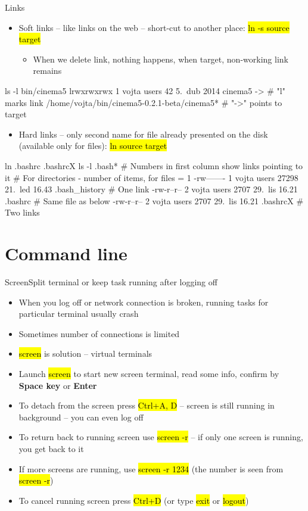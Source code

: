 \documentclass[compress, ucs, xelatex, 11pt, xcolor=svgnames,
  hyperref={
    bookmarks=true,
    unicode=true,
    colorlinks=true,
    pdftitle={Linux, command line and MetaCentrum},
    plainpages=false,
    pdfauthor={Vojtech Zeisek},
    pdfsubject={Course about use of Linux command line, writing shell scripts and using MetaCentrum of CESNET},
    pdfcreator={XeLaTeX},
    pdfkeywords={Linux, GNU, BASH, shell, command line, MetaCentrum},
    linkcolor=Red,
    anchorcolor=Blue,
    citecolor=Purple,
    filecolor=DodgerBlue,
    menucolor=DarkOrchid,
    urlcolor=DeepSkyBlue,
    pdftex},
  url={hyphens, lowtilde} %
  ]{beamer}
\renewcommand{\texttt}[1]{\hl{\ttfamily #1}}
\begin{document}
\begin{frame}[fragile, label=links]{Links}
\begin{itemize}
  \item Soft links -- like links on the web -- short-cut to another place: \texttt{ln -s source target}
  \begin{itemize}
    \item When we delete link, nothing happens, when target, non-working link remains
  \end{itemize}
\end{itemize}
  \begin{bashcode}
    ls -l bin/cinema5
    lrwxrwxrwx 1 vojta users 42 5. dub 2014 cinema5 -> # "l" marks link
      /home/vojta/bin/cinema5-0.2.1-beta/cinema5* # "->" points to target
  \end{bashcode}
\begin{itemize}
  \item Hard links -- only second name for file already presented on the disk (available only for files): \texttt{ln source target}
\end{itemize}
  \begin{bashcode}
    ln .bashrc .bashrcX
    ls -l .bash* # Numbers in first column show links pointing to it
                 # For directories - number of items, for files = 1
    -rw------- 1 vojta users 27298 21. led 16.43 .bash_history # One link
    -rw-r--r-- 2 vojta users  2707 29. lis 16.21 .bashrc # Same file as below
    -rw-r--r-- 2 vojta users  2707 29. lis 16.21 .bashrcX # Two links
  \end{bashcode}
\end{frame}

\section{Command line}

\begin{frame}{Screen}{Split terminal or keep task running after logging off}
\begin{itemize}
  \item When you log off or network connection is broken, running tasks for particular terminal usually crash
  \item Sometimes number of connections is limited
  \item \texttt{screen} is solution -- virtual terminals
  \item Launch \texttt{screen} to start new screen terminal, read some info, confirm by \textbf{Space key} or \textbf{Enter}
  \item To detach from the screen press \texttt{Ctrl+A, D} -- screen is still running in background -- you can even log off
  \item To return back to running screen use \texttt{screen -r} -- if only one screen is running, you get back to it
  \item If more screens are running, use \texttt{screen -r 1234} (the number is seen from \texttt{screen -r})
  \item To cancel running screen press \texttt{Ctrl+D} (or type \texttt{exit} or \texttt{logout})
\end{itemize}
\end{frame}
\end{document}
